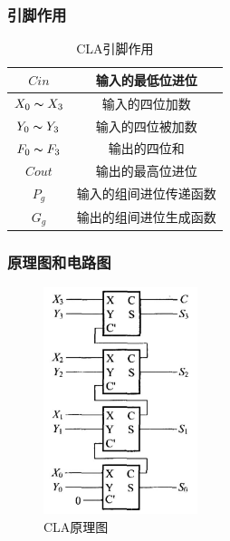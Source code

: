 \documentclass{article}
\begin{document}
    \subsubsection{引脚作用}
    \begin{table}[H]
    \centering
    \begin{tabular}{|c|c|}
        \hline
        $Cin$  & 输入的最低位进位 \\ \hline
        $X_{0}\thicksim X_{3}$ & 输入的四位加数 \\ \hline
        $Y_{0}\thicksim Y_{3}$   & 输入的四位被加数 \\ \hline
        $F_{0}\thicksim F_{3}$   & 输出的四位和 \\ \hline
        $Cout$   & 输出的最高位进位 \\ \hline
        $P_{g}$   & 输入的组间进位传递函数 \\ \hline
        $G_{g}$   & 输出的组间进位生成函数 \\ \hline
    \end{tabular}
    \caption{CLA引脚作用}
    \end{table}

    \subsubsection{原理图和电路图}
    \begin{figure}[H]
    \centering
    \includegraphics[width=0.4\textwidth]{2.4.1.png}
    \caption{CLA原理图}
    \end{figure}
\end{document}
